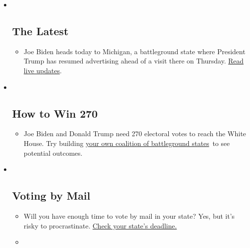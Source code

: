 \begin{itemize}
\item ~
  \hypertarget{the-latest}{%
  \subsection{The Latest}\label{the-latest}}

  \begin{itemize}
  \item
    Joe Biden heads today to Michigan, a battleground state where
    President Trump has resumed advertising ahead of a visit there on
    Thursday.
    \href{https://www.nytimes3xbfgragh.onion/live/2020/09/09/us/trump-vs-biden?action=click\&pgtype=Article\&state=default\&region=BELOW_MAIN_CONTENT\&context=storylines_guide}{Read
    live updates}.
  \end{itemize}
\item ~
  \hypertarget{how-to-win-270}{%
  \subsection{How to Win 270}\label{how-to-win-270}}

  \begin{itemize}
  \item
    Joe Biden and Donald Trump need 270 electoral votes to reach the
    White House. Try building
    \href{https://www.nytimes3xbfgragh.onion/interactive/2020/us/elections/election-states-biden-trump.html?action=click\&pgtype=Article\&state=default\&region=BELOW_MAIN_CONTENT\&context=storylines_guide}{your
    own coalition of battleground states}~to see potential outcomes.
  \end{itemize}
\item ~
  \hypertarget{voting-by-mail}{%
  \subsection{Voting by Mail}\label{voting-by-mail}}

  \begin{itemize}
  \item
    Will you have enough time to vote by mail in your state? Yes, but
    it's risky to procrastinate.
    \href{https://www.nytimes3xbfgragh.onion/interactive/2020/08/31/us/politics/vote-by-mail-deadlines.html?action=click\&pgtype=Article\&state=default\&region=BELOW_MAIN_CONTENT\&context=storylines_guide}{Check
    your state's deadline.}
  \item
    \href{https://www.nytimes3xbfgragh.onion/interactive/2020/us/elections/joe-biden.html?action=click\&pgtype=Article\&state=default\&region=BELOW_MAIN_CONTENT\&context=storylines_guide}{}


\end{itemize}
\end{itemize}
